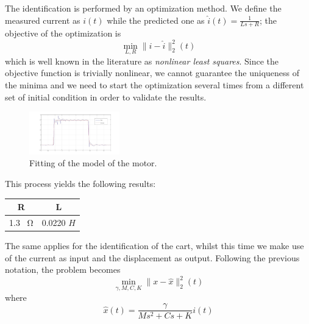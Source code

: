 The identification is performed by an optimization method. We define the measured current as $i(t)$ while the predicted one as $\hat{i}(t) = \frac{1}{Ls+R}$; the objective of the optimization is
\begin{equation}
\min_{L,R} \|i-\hat{i}\|_2^2(t)
\end{equation}
which is well known in the literature as \emph{nonlinear least squares}. Since the objective function is trivially nonlinear, we cannot guarantee the uniqueness of the minima and we need to start the optimization several times from a different set of initial condition in order to validate the results.\\

\begin{figure}[h]
\centering
\includegraphics[width=0.35\textwidth]{img/graybox_motor.jpg}
\caption{Fitting of the model of the motor.}
\end{figure}

This process yields the following results:\\

\def\arraystretch{1.5}
\begin{table}[h]
\centering
\begin{tabular}{|c|c|}
	\hline
	R & L \\
	\hline
	1.3 \SI{}{\ohm}  & 0.0220 $H$ \\
	\hline
\end{tabular}
\end{table}

The same applies for the identification of the cart, whilst this time we make use of the current as input and the displacement as output. Following the previous notation, the problem becomes
\begin{equation}
\min_{\gamma,M,C,K} \|x-\hat{x}\|_2^2(t)
\end{equation}
where
\begin{equation}
\hat{x}(t) = \frac{\gamma}{Ms^2+Cs+K} i(t)
\end{equation}


